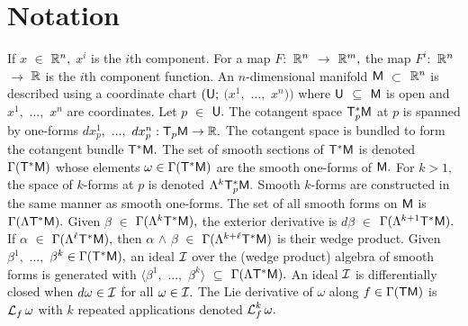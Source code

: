 \documentclass[a4paper]{ifacconf}
\begin{document}
\section{Notation}
If \(x\) \(\in\) \(\Reals^n,\) \(x^i\) is the \(i\)th component.
For a map \(F:\) \(\Reals^n\) \(\to\) \(\Reals^m,\) the map \(F^i:\) \(\Reals^n\) \(\to\) \(\Reals\) is the \(i\)th component function.
An \(n\)-dimensional manifold \(\Manifold{M}\) \(\subset\) \(\Reals^n\) is described using a coordinate chart \((\OpenSet{U};\) \((x^1,\) \(\ldots,\) \(x^n))\) where \(\OpenSet{U}\) \(\subseteq\) \(\Manifold{M}\) is open and \(x^1,\) \(\ldots,\) \(x^n\) are coordinates.
Let \(p\) \(\in\) \(\OpenSet{U}.\)
The cotangent space \(\CotangentSpace{\Manifold{M}}{p}\) at \(p\) is spanned by one-forms \(dx^1_p,\) \(\ldots,\) \(dx^n_p : \TangentSpace{\Manifold{M}}{p} \to \Reals.\)
The cotangent space is bundled to form the cotangent bundle \(\CotangentBundle{\Manifold{M}}.\)
The set of smooth sections of \(\CotangentBundle{\Manifold{M}}\) is denoted \(\CoTangentSections{\Manifold{M}}\) whose elements \(\omega\in \CoTangentSections{\Manifold{M}}\) are the smooth one-forms of \(\Manifold{M}.\)
For \(k > 1,\) the space of \(k\)-forms at \(p\) is denoted \(\KFormSpaceAt{\Manifold{M}}{p}{k}.\)
Smooth \(k\)-forms are constructed in the same manner as smooth one-forms.
The set of all smooth forms on \(\Manifold{M}\) is \(\FormSections{\Manifold{M}}.\)
Given \(\beta\) \(\in\) \(\SmoothSections{\KFormSpaceOf{\Manifold{M}}{k}},\) the exterior derivative is \(d\beta\) \(\in\) \(\SmoothSections{\KFormSpaceOf{\Manifold{M}}{k+1}}.\)
If \(\alpha\) \(\in\) \(\SmoothSections{\KFormSpaceOf{\Manifold{M}}{\ell}},\) then \(\alpha\) \(\wedge\) \(\beta\) \(\in\) \(\SmoothSections{\KFormSpaceOf{\Manifold{M}}{k+\ell}}\) is their wedge product.
Given \(\beta^1,\) \(\ldots,\) \(\beta^k \in \CoTangentSections{\Manifold{M}},\) an ideal \(\Ideal{I}\) over the (wedge product) algebra of smooth forms is generated with \(\langle \beta^1,\) \(\ldots,\) \(\beta^k \rangle\) \(\subseteq\) \(\FormSections{\Manifold{M}}.\)
An ideal \(\Ideal{I}\) is differentially closed when \(d\omega \in \Ideal{I}\) for all \(\omega \in \Ideal{I}.\)
The Lie derivative of \(\omega\) along \(f \in \TangentSections{\Manifold{M}}\) is \(\LieDerivative{f}\omega\) with \(k\) repeated applications denoted \(\LieDerivative{f}^k\omega.\)
\end{document}
